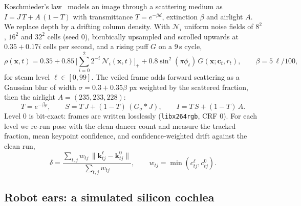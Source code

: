 \documentclass[10pt]{article}
\begin{document}
Koschmieder's law~\cite{koschmieder1924,narasimhan2002vision} models an image through a scattering medium as $I = J\,T + A\,(1-T)$ with transmittance $T=e^{-\beta d}$, extinction $\beta$ and airlight $A$. We replace depth by a drifting column density. With $\mathcal{N}_i$ uniform noise fields of $8^2$, $16^2$ and $32^2$ cells (seed 0), bicubically upsampled and scrolled upwards at $0.35+0.17i$ cells per second, and a rising puff $G$ on a 9\,s cycle,
\begin{equation}
  \rho(\mathbf{x},t) = 0.35 + 0.85\,\Big[\textstyle\sum_{i=0}^{2} 2^{-i}\,\mathcal{N}_i(\mathbf{x},t)\Big]_+ + 0.8\sin^2(\pi\phi_t)\,G(\mathbf{x};\mathbf{c}_t,r_t), \qquad
  \beta = 5\,\ell/100,
  \label{eq:density}
\end{equation}
for steam level $\ell\in[0,99]$. The veiled frame adds forward scattering as a Gaussian blur of width $\sigma=0.3+0.35\beta$ px weighted by the scattered fraction, then the airlight $A=(235,233,228)$:
\begin{equation}
  T = e^{-\beta\rho}, \qquad
  S = T\,J + (1-T)\,(G_\sigma * J), \qquad
  I = T\,S + (1-T)\,A .
  \label{eq:steam}
\end{equation}
Level 0 is bit-exact: frames are written losslessly (\texttt{libx264rgb}, CRF 0). For each level we re-run pose with the clean dancer count and measure the tracked fraction, mean keypoint confidence, and confidence-weighted drift against the clean run,
\begin{equation}
  \delta = \frac{\sum_{t,j} w_{tj}\,\|\mathbf{k}^{\ell}_{tj} - \mathbf{k}^{0}_{tj}\|}{\sum_{t,j} w_{tj}}, \qquad w_{tj} = \min(c^{\ell}_{tj}, c^{0}_{tj}).
  \label{eq:drift}
\end{equation}

\subsection{Robot ears: a simulated silicon cochlea}
\label{sec:ears}
\end{document}
